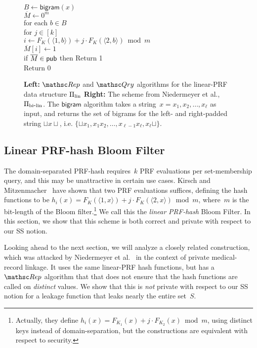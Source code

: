 \begin{figure}[tp]
{\medskip
{}\\
$B \gets \mathsf{bigram}(x)$\\
$\overline{M} \gets 0^m$\\
for each $b \in B$\\
\nudge for $j \in [k]$\\
\nudge\nudge $i \gets F_{K}(\langle 1,b \rangle)+j\cdot F_{K}(\langle 2,b \rangle) \bmod m$\\
\nudge\nudge $\overline{M}[i] \gets 1$\\
if $\overline{M} \in {\sf pub}$ then Return 1 \\
Return 0
}
\caption{{\bf Left:} $\Rep$ and $\Qry$ algorithms for the linear-PRF
  data structure $\Pi_{\mathrm{lin}}$ {\bf Right:}
The scheme from Niedermeyer et al.\cite{niedermeyer2014cryptanalysis}, $\Pi_{\mathrm{bi}\mbox{-}\mathrm{lin}}$.
The $\mathsf{bigram}$ algorithm takes a
string~$x=x_1,x_2,\ldots,x_\ell$ as input, and returns the set of
bigrams for the left- and right-padded string $\sqcup x \sqcup$,
i.e. $\{\sqcup x_1, x_1x_2,\ldots,x_{\ell-1}x_\ell,x_\ell\sqcup\}$.
} \label{fig:lin-and-bi-lin}
\label{fig:niedermeyer}
\end{figure}

\subsection{Linear PRF-hash Bloom Filter }
The domain-separated PRF-hash requires~$k$ PRF evaluations per set-membership query, and this may be unattractive in certain use cases.  Kirsch and Mitzenmacher~\cite{kirsch2006less} have shown that two PRF evaluations suffices, defining the hash functions to be $h_i(x)=F_K(\langle 1,x \rangle) + j\cdot F_K(\langle 2,x \rangle) \bmod m$, where~$m$ is the bit-length of the Bloom filter.\footnote{Actually, they define $h_i(x)=F_{K_1}(x)  + j\cdot F_{K_2}(x) \bmod m$, using distinct keys instead of domain-separation, but the constructions are equivalent with respect to security.} We call this the \emph{linear PRF-hash} Bloom Filter.  In this section, we show that this scheme is both correct and private with respect to our SS notion.

Looking ahead to the next section, we will analyze a closely related construction, which was attacked by Niedermeyer et al.~\cite{niedermeyer2014cryptanalysis} in the context of private medical-record linkage.  It uses the same linear-PRF hash functions, but has a $\Rep$ algorithm that that does not ensure that the hash functions are called on \emph{distinct} values.  We show that this is \emph{not} private with respect to our SS notion for a leakage function that leaks nearly the entire set~$S$. 

